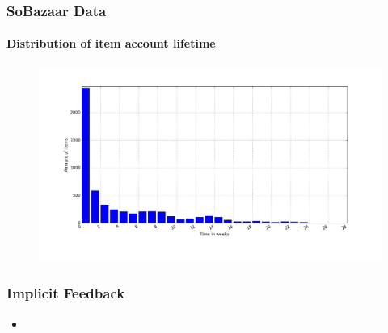\documentclass{beamer}
\begin{document}
  \begin{frame}
    \frametitle{SoBazaar Data}
    \framesubtitle{Distribution of item account lifetime}
    \begin{figure}[H]
        \includegraphics[scale=0.3]{../src/image/itemTimespansdistribution.png}
        \centering
    \end{figure}
  \end{frame}

  \begin{frame}
    \frametitle{Implicit Feedback}
    \begin{itemize}
      \item
    \end{itemize}
  \end{frame}
\end{document}
